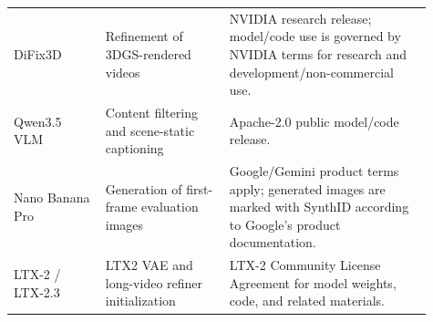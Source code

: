 \begin{table}[t]
\begin{tabular}{@{}p{0.20\linewidth}p{0.27\linewidth}p{0.44\linewidth}@{}}
    DiFix3D~\citep{difix3d} & Refinement of 3DGS-rendered videos & NVIDIA research release; model/code use is governed by NVIDIA terms for research and development/non-commercial use. \\
    Qwen3.5 VLM~\citep{qwen3_5} & Content filtering and scene-static captioning & Apache-2.0 public model/code release. \\
    Nano Banana Pro~\citep{google2025nanobananapro} & Generation of first-frame evaluation images & Google/Gemini product terms apply; generated images are marked with SynthID according to Google's product documentation. \\
    LTX-2 / LTX-2.3~\citep{ltx2} & LTX2 VAE and long-video refiner initialization & LTX-2 Community License Agreement for model weights, code, and related materials. \\
    \bottomrule
  \end{tabular}
\end{table}

